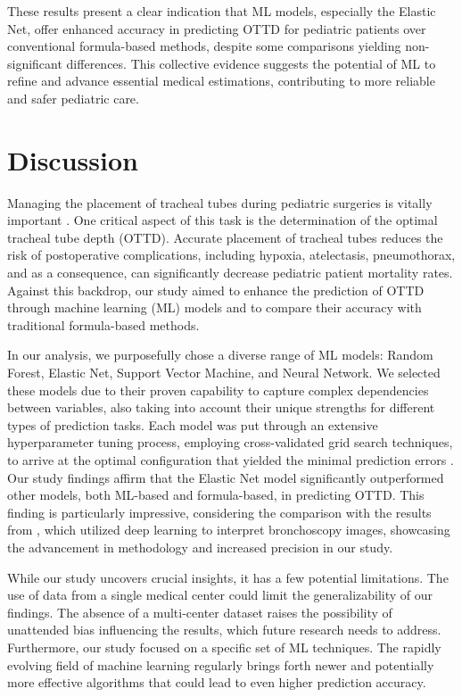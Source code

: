 \documentclass[11pt]{article}
\begin{document}
These results present a clear indication that ML models, especially the Elastic Net, offer enhanced accuracy in predicting OTTD for pediatric patients over conventional formula-based methods, despite some comparisons yielding non-significant differences. This collective evidence suggests the potential of ML to refine and advance essential medical estimations, contributing to more reliable and safer pediatric care.

\section*{Discussion}

Managing the placement of tracheal tubes during pediatric surgeries is vitally important \cite{Kollef1994EndotrachealTM, Cook2005ThePL, Apfelbaum20212022AS}. One critical aspect of this task is the determination of the optimal tracheal tube depth (OTTD). Accurate placement of tracheal tubes reduces the risk of postoperative complications, including hypoxia, atelectasis, pneumothorax, and as a consequence, can significantly decrease pediatric patient mortality rates. Against this backdrop, our study aimed to enhance the prediction of OTTD through machine learning (ML) models and to compare their accuracy with traditional formula-based methods.

In our analysis, we purposefully chose a diverse range of ML models: Random Forest, Elastic Net, Support Vector Machine, and Neural Network. We selected these models due to their proven capability to capture complex dependencies between variables, also taking into account their unique strengths for different types of prediction tasks. Each model was put through an extensive hyperparameter tuning process, employing cross-validated grid search techniques, to arrive at the optimal configuration that yielded the minimal prediction errors \cite{Yoo2021DeepLF, Hussain2011MachinabilityOG}. Our study findings affirm that the Elastic Net model significantly outperformed other models, both ML-based and formula-based, in predicting OTTD. This finding is particularly impressive, considering the comparison with the results from \cite{Yoo2021DeepLF}, which utilized deep learning to interpret bronchoscopy images, showcasing the advancement in methodology and increased precision in our study.

While our study uncovers crucial insights, it has a few potential limitations. The use of data from a single medical center could limit the generalizability of our findings. The absence of a multi-center dataset raises the possibility of unattended bias influencing the results, which future research needs to address. Furthermore, our study focused on a specific set of ML techniques. The rapidly evolving field of machine learning regularly brings forth newer and potentially more effective algorithms that could lead to even higher prediction accuracy.
\end{document}
